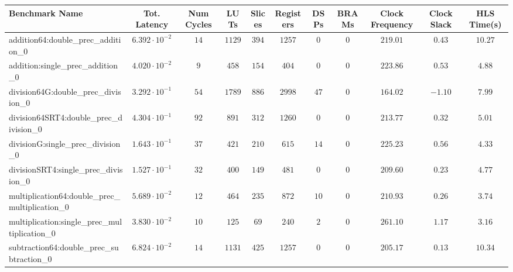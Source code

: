 \begin{tabular}{|l|c|c|c|c|c|c|c|c|c|c|}
\hline
Benchmark Name                                   & Tot. Latency            & Num Cycles & LUTs     & Slices   & Registers & DSPs   & BRAMs & Clock Frequency & Clock Slack & HLS Time(s) \\
\hline
addition64:double\_prec\_addition\_0             & $ 6.392 \cdot 10^{-2} $ & $ 14     $ & $ 1129 $ & $ 394  $ & $ 1257  $ & $ 0  $ & $ 0 $ & $ 219.01      $ & $ 0.43    $ & $ 10.27   $ \\
addition:single\_prec\_addition\_0               & $ 4.020 \cdot 10^{-2} $ & $ 9      $ & $ 458  $ & $ 154  $ & $ 404   $ & $ 0  $ & $ 0 $ & $ 223.86      $ & $ 0.53    $ & $ 4.88    $ \\
division64G:double\_prec\_division\_0            & $ 3.292 \cdot 10^{-1} $ & $ 54     $ & $ 1789 $ & $ 886  $ & $ 2998  $ & $ 47 $ & $ 0 $ & $ 164.02      $ & $ -1.10   $ & $ 7.99    $ \\
division64SRT4:double\_prec\_division\_0         & $ 4.304 \cdot 10^{-1} $ & $ 92     $ & $ 891  $ & $ 312  $ & $ 1260  $ & $ 0  $ & $ 0 $ & $ 213.77      $ & $ 0.32    $ & $ 5.01    $ \\
divisionG:single\_prec\_division\_0              & $ 1.643 \cdot 10^{-1} $ & $ 37     $ & $ 421  $ & $ 210  $ & $ 615   $ & $ 14 $ & $ 0 $ & $ 225.23      $ & $ 0.56    $ & $ 4.33    $ \\
divisionSRT4:single\_prec\_division\_0           & $ 1.527 \cdot 10^{-1} $ & $ 32     $ & $ 400  $ & $ 149  $ & $ 481   $ & $ 0  $ & $ 0 $ & $ 209.60      $ & $ 0.23    $ & $ 4.77    $ \\
multiplication64:double\_prec\_multiplication\_0 & $ 5.689 \cdot 10^{-2} $ & $ 12     $ & $ 464  $ & $ 235  $ & $ 872   $ & $ 10 $ & $ 0 $ & $ 210.93      $ & $ 0.26    $ & $ 3.74    $ \\
multiplication:single\_prec\_multiplication\_0   & $ 3.830 \cdot 10^{-2} $ & $ 10     $ & $ 125  $ & $ 69   $ & $ 240   $ & $ 2  $ & $ 0 $ & $ 261.10      $ & $ 1.17    $ & $ 3.16    $ \\
subtraction64:double\_prec\_subtraction\_0       & $ 6.824 \cdot 10^{-2} $ & $ 14     $ & $ 1131 $ & $ 425  $ & $ 1257  $ & $ 0  $ & $ 0 $ & $ 205.17      $ & $ 0.13    $ & $ 10.34   $ \\

\end{tabular}
